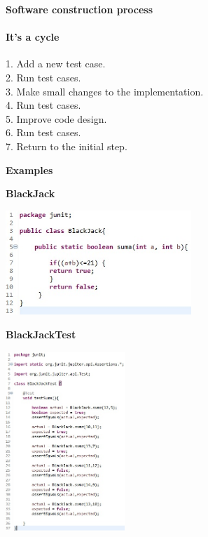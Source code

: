 \documentclass[11pt]{beamer}
\begin{document}

\begin{frame}{\textbf{Software construction process}}
\framesubtitle{It's a cycle}
1. Add a new test case. \\
2. Run test cases.\\
3. Make small changes to the implementation.\\
4. Run test cases.\\
5. Improve code design.\\
6. Run test cases.\\
7. Return to the initial step.
\end{frame}


\begin{frame}

\begin{center}
\textbf{\bf\Huge Examples} 
\end{center}

\end{frame}


\begin{frame}{\textbf{BlackJack}}

\begin{center}
\includegraphics[width=7.0cm]{img/Ejemplo1.jpg}
\end{center}

\end{frame}


\begin{frame}{\textbf{BlackJackTest}}

\begin{center}
\includegraphics[width=4.5cm]{img/Prueba1.jpg}
\end{center}

\end{frame}
\end{document}
